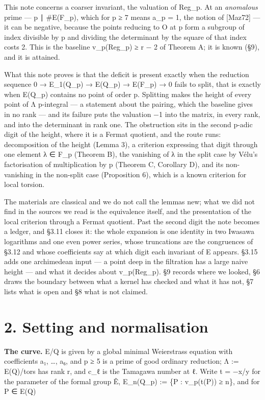 \documentclass[11pt,a4paper]{article}
\theoremstyle{named}
\begin{document}
This note concerns a coarser invariant, the valuation of Reg\_p. At an \textit{anomalous} prime — p ∣ \#E(F\_p), which for p ≥ 7 means a\_p = 1, the notion of [Maz72] — it can be negative, because the points reducing to O at p form a subgroup of index divisible by p and dividing the determinant by the square of that index costs 2. This is the baseline v\_p(Reg\_p) ≥ r − 2 of Theorem A; it is known (§9), and it is attained.

What this note proves is that the deficit is present exactly when the reduction sequence 0 → E\_1(Q\_p) → E(Q\_p) → E(F\_p) → 0 fails to split, that is exactly when E(Q\_p) contains no point of order p. Splitting makes the height of every point of Λ p-integral — a statement about the pairing, which the baseline gives in no rank — and its failure puts the valuation −1 into the matrix, in every rank, and into the determinant in rank one. The obstruction sits in the second p-adic digit of the height, where it is a Fermat quotient, and the route runs: decomposition of the height (Lemma 3), a criterion expressing that digit through one element λ ∈ F\_p (Theorem B), the vanishing of λ in the split case by Vélu's factorisation of multiplication by p (Theorem C, Corollary D), and its non-vanishing in the non-split case (Proposition 6), which is a known criterion for local torsion.

The materials are classical and we do not call the lemmas new; what we did not find in the sources we read is the equivalence itself, and the presentation of the local criterion through a Fermat quotient. Past the second digit the note becomes a ledger, and §3.11 closes it: the whole expansion is one identity in two Iwasawa logarithms and one even power series, whose truncations are the congruences of §3.12 and whose coefficients say at which digit each invariant of E appears. §3.15 adds one archimedean input — a point deep in the filtration has a large naive height — and what it decides about v\_p(Reg\_p). §9 records where we looked, §6 draws the boundary between what a kernel has checked and what it has not, §7 lists what is open and §8 what is not claimed.

\section*{2. Setting and normalisation}

\textbf{The curve.} E/Q is given by a global minimal Weierstrass equation with coefficients a₁, …, a₆, and p ≥ 5 is a prime of good ordinary reduction; Λ := E(Q)/tors has rank r, and c\_ℓ is the Tamagawa number at ℓ. Write t = −x/y for the parameter of the formal group Ê, E\_n(Q\_p) := \{P : v\_p(t(P)) ≥ n\}, and for P ∈ E(Q)
\end{document}
